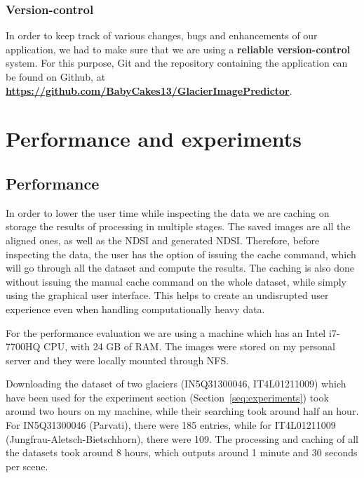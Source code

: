 \documentclass[12pt, a4paper]{report}
\begin{document}
	\subsection{Version-control}
	\label{seq:versioning}
	
	\par In order to keep track of various changes, bugs and enhancements of our application, we had to make sure that we are using a \textbf{reliable version-control} system. For this purpose, Git and the repository containing the application can be found on Github, at \textbf{\url{https://github.com/BabyCakes13/GlacierImagePredictor}}.
	
	\newpage{}
	\chapter{Performance and experiments}

	
	\section{Performance}
	\label{seq:performance}
	
	\par In order to lower the user time while inspecting the data we are caching on storage the results of processing in multiple stages. The saved images are all the aligned ones, as well as the NDSI and generated NDSI. Therefore, before inspecting the data, the user has the option of issuing the cache command, which will go through all the dataset and compute the results. The caching is also done without issuing the manual cache command on the whole dataset, while simply using the graphical user interface. This helps to create an undisrupted user experience even when handling computationally heavy data.
	
	For the performance evaluation we are using a machine which has an Intel i7-7700HQ CPU, with 24 GB of RAM. The images were stored on my personal server and they were locally mounted through NFS.
	
	Downloading the dataset of two glaciers (IN5Q31300046, IT4L01211009) which have been used for the experiment section (Section~\ref{seq:experiments}) took around two hours on my machine, while their searching took around half an hour. For IN5Q31300046 (Parvati), there were 185 entries, while for IT4L01211009 (Jungfrau-Aletsch-Bietschhorn), there were 109. The processing and caching of all the datasets took around 8 hours, which outputs around 1 minute and 30 seconds per scene.
	
\end{document}
